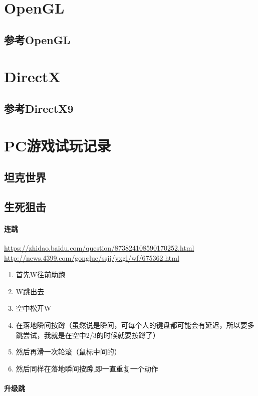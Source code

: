 \documentclass[UTF8,a4paper,8pt]{ctexart}
\begin{document}
\newpage
\section{OpenGL}
	\subsection{参考OpenGL}
	
\newpage
\section{DirectX}
	\subsection{参考DirectX9}
	
\newpage
\section{PC游戏试玩记录}
	\subsection{坦克世界}
	
	\subsection{生死狙击}
		\paragraph{连跳}
			\url{https://zhidao.baidu.com/question/873824108590170252.html}
			\url{http://news.4399.com/gonglue/ssjj/yxgl/wf/675362.html}
			\begin{enumerate}
				\item 首先W往前助跑
				\item W跳出去
				\item 空中松开W
				\item 在落地瞬间按蹲（虽然说是瞬间，可每个人的键盘都可能会有延迟，所以要多跳尝试，我就是在空中2/3的时候就要按蹲了）
				\item 然后再滑一次轮滚（鼠标中间的）
				\item 然后同样在落地瞬间按蹲,即一直重复一个动作
			\end{enumerate}

		\paragraph{升级跳}
	
\end{document}
